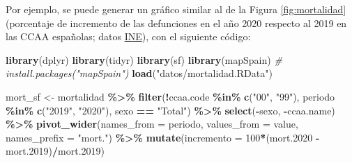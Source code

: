\documentclass[
]{book}
\newenvironment{Shaded}{\begin{snugshade}}{\end{snugshade}}
\newcommand{\AttributeTok}[1]{\textcolor[rgb]{0.13,0.29,0.53}{#1}}
\newcommand{\CommentTok}[1]{\textcolor[rgb]{0.56,0.35,0.01}{\textit{#1}}}
\newcommand{\DecValTok}[1]{\textcolor[rgb]{0.00,0.00,0.81}{#1}}
\newcommand{\FloatTok}[1]{\textcolor[rgb]{0.00,0.00,0.81}{#1}}
\newcommand{\FunctionTok}[1]{\textcolor[rgb]{0.13,0.29,0.53}{\textbf{#1}}}
\newcommand{\NormalTok}[1]{#1}
\newcommand{\OtherTok}[1]{\textcolor[rgb]{0.56,0.35,0.01}{#1}}
\newcommand{\SpecialCharTok}[1]{\textcolor[rgb]{0.81,0.36,0.00}{\textbf{#1}}}
\newcommand{\StringTok}[1]{\textcolor[rgb]{0.31,0.60,0.02}{#1}}
\theoremstyle{break}
\theoremstyle{definition}
\theoremstyle{definition}
\theoremstyle{definition}
\theoremstyle{definition}
\theoremstyle{remark}
\begin{document}
Por ejemplo, se puede generar un gráfico similar al de la Figura \ref{fig:mortalidad} (porcentaje de incremento de las defunciones en el año 2020 respecto al 2019 en las CCAA españolas; datos \href{https://www.ine.es/jaxiT3/Tabla.htm?t=6546}{INE}), con el siguiente código:

\begin{Shaded}
\begin{Highlighting}[]
\FunctionTok{library}\NormalTok{(dplyr)}
\FunctionTok{library}\NormalTok{(tidyr)}
\FunctionTok{library}\NormalTok{(sf)}
\FunctionTok{library}\NormalTok{(mapSpain) }\CommentTok{\# install.packages("mapSpain")}
\FunctionTok{load}\NormalTok{(}\StringTok{"datos/mortalidad.RData"}\NormalTok{)}

\NormalTok{mort\_sf }\OtherTok{\textless{}{-}}\NormalTok{ mortalidad }\SpecialCharTok{\%\textgreater{}\%}
  \FunctionTok{filter}\NormalTok{(}\SpecialCharTok{!}\NormalTok{ccaa.code }\SpecialCharTok{\%in\%} \FunctionTok{c}\NormalTok{(}\StringTok{"00"}\NormalTok{, }\StringTok{"99"}\NormalTok{), periodo }\SpecialCharTok{\%in\%} \FunctionTok{c}\NormalTok{(}\StringTok{"2019"}\NormalTok{, }\StringTok{"2020"}\NormalTok{), sexo }\SpecialCharTok{==} \StringTok{"Total"}\NormalTok{) }\SpecialCharTok{\%\textgreater{}\%}
  \FunctionTok{select}\NormalTok{(}\SpecialCharTok{{-}}\NormalTok{sexo, }\SpecialCharTok{{-}}\NormalTok{ccaa.name) }\SpecialCharTok{\%\textgreater{}\%}
  \FunctionTok{pivot\_wider}\NormalTok{(}\AttributeTok{names\_from =}\NormalTok{ periodo, }\AttributeTok{values\_from =}\NormalTok{ value, }\AttributeTok{names\_prefix =} \StringTok{"mort."}\NormalTok{) }\SpecialCharTok{\%\textgreater{}\%}
  \FunctionTok{mutate}\NormalTok{(}\AttributeTok{incremento =} \DecValTok{100}\SpecialCharTok{*}\NormalTok{(mort}\FloatTok{.2020} \SpecialCharTok{{-}}\NormalTok{ mort}\FloatTok{.2019}\NormalTok{)}\SpecialCharTok{/}\NormalTok{mort}\FloatTok{.2019}\NormalTok{)}


\end{Highlighting}
\end{Shaded}
\end{document}
